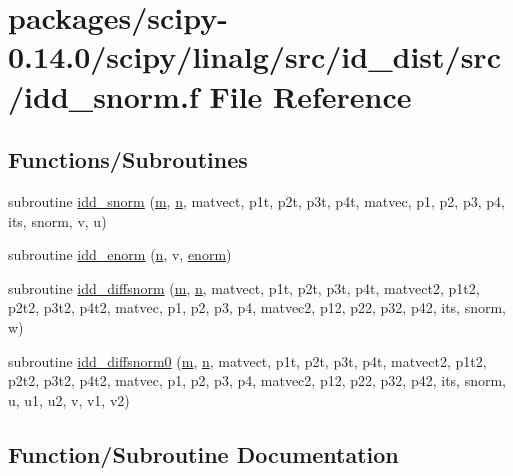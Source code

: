 \hypertarget{idd__snorm_8f}{}\section{packages/scipy-\/0.14.0/scipy/linalg/src/id\+\_\+dist/src/idd\+\_\+snorm.f File Reference}
\label{idd__snorm_8f}
\subsection*{Functions/\+Subroutines}
\begin{DoxyCompactItemize}
\item 
subroutine \hyperlink{idd__snorm_8f_aca16ff7a838d3a9dc0f18873b085d734}{idd\+\_\+snorm} (\hyperlink{indexexpr_8h_ab72fdb4031d47b75ab26dd18a437bcdc}{m}, \hyperlink{indexexpr_8h_ab427e2e2b4d6cec55fa088ea2a692ace}{n}, matvect, p1t, p2t, p3t, p4t, matvec, p1, p2, p3, p4, its, snorm, v, u)
\item 
subroutine \hyperlink{idd__snorm_8f_a909efba8e56c328713046a31fb30511f}{idd\+\_\+enorm} (\hyperlink{indexexpr_8h_ab427e2e2b4d6cec55fa088ea2a692ace}{n}, v, \hyperlink{enorm_8f_afa3026fec2903ac5b425637b0293e6c5}{enorm})
\item 
subroutine \hyperlink{idd__snorm_8f_a3e842cd2689190fcc36cf9aaa7604c7a}{idd\+\_\+diffsnorm} (\hyperlink{indexexpr_8h_ab72fdb4031d47b75ab26dd18a437bcdc}{m}, \hyperlink{indexexpr_8h_ab427e2e2b4d6cec55fa088ea2a692ace}{n}, matvect, p1t, p2t, p3t, p4t, matvect2, p1t2, p2t2, p3t2, p4t2, matvec, p1, p2, p3, p4, matvec2, p12, p22, p32, p42, its, snorm, w)
\item 
subroutine \hyperlink{idd__snorm_8f_a7ba663c9d0a2d641ef82ad0f2486621d}{idd\+\_\+diffsnorm0} (\hyperlink{indexexpr_8h_ab72fdb4031d47b75ab26dd18a437bcdc}{m}, \hyperlink{indexexpr_8h_ab427e2e2b4d6cec55fa088ea2a692ace}{n}, matvect, p1t, p2t, p3t, p4t, matvect2, p1t2, p2t2, p3t2, p4t2, matvec, p1, p2, p3, p4, matvec2, p12, p22, p32, p42, its, snorm, u, u1, u2, v, v1, v2)
\end{DoxyCompactItemize}


\subsection{Function/\+Subroutine Documentation}
\hypertarget{idd__snorm_8f_a3e842cd2689190fcc36cf9aaa7604c7a}{}

